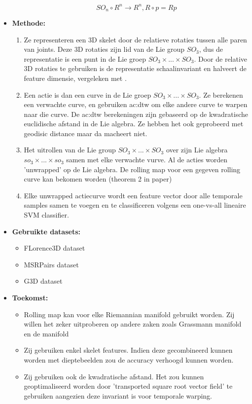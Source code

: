 \begin{itemize}
\begin{itemize}
		$$SO_n \circ R^n \rightarrow R^n, R \circ p = Rp$$
	\end{itemize}
	\item \textbf{Methode:} 
	\begin{enumerate}
		\item Ze representeren een 3D skelet door de relatieve rotaties tussen alle paren van joints. Deze 3D rotaties zijn lid van de Lie group $SO_3$, dus de representatie is een punt in de Lie groep $SO_3 \times ... \times SO_3$. Door de relative 3D rotaties te gebruiken is de representatie schaalinvariant en halveert de feature dimensie, vergeleken met \cite{Vemulapalli2014}.
		\item Een actie is dan een curve in de Lie groep $SO_3 \times ... \times SO_3$. Ze berekenen een verwachte curve, en gebruiken \gls{ac:dtw} om elke andere curve te warpen naar die curve. De \gls{ac:dtw} berekeningen zijn gebaseerd op de kwadratische euclidische afstand in de Lie algebra. Ze hebben het ook geprobeerd met geodisic distance maar da macheert niet. 
		\item Het uitrollen van de Lie group $SO_3 \times ... \times SO_3$ over zijn Lie algebra $so_3 \times ... \times so_3$ samen met elke verwachte vurve. Al de acties worden 'unwrapped' op de Lie algebra. De rolling map voor een gegeven rolling curve kan bekomen worden (theorem 2 in paper)
		\item Elke unwrapped actiecurve wordt een feature vector door alle temporale samples samen te voegen en te classificeren volgens een one-vs-all lineaire SVM classifier.
	\end{enumerate}
	\item \textbf{Gebruikte datasets:}
	\begin{itemize}
		\item FLorence3D dataset
		\item MSRPairs dataset
		\item G3D dataset
	\end{itemize}
	\item \textbf{Toekomst:}
	\begin{itemize}
		\item Rolling map kan voor elke Riemannian manifold gebruikt worden. Zij willen het zeker uitproberen op andere zaken zoals Grassmann manifold en de manifold 
		\item Zij gebruiken enkel skelet features. Indien deze gecombineerd kunnen worden met dieptebeelden zou de accuracy verhoogd kunnen worden.
		\item Zij gebruiken ook de kwadratische afstand. Het zou kunnen geoptimaliseerd worden door 'transported square root vector field' \cite{Su2014} te gebruiken aangezien deze invariant is voor temporale warping.
	\end{itemize}
\end{itemize}



